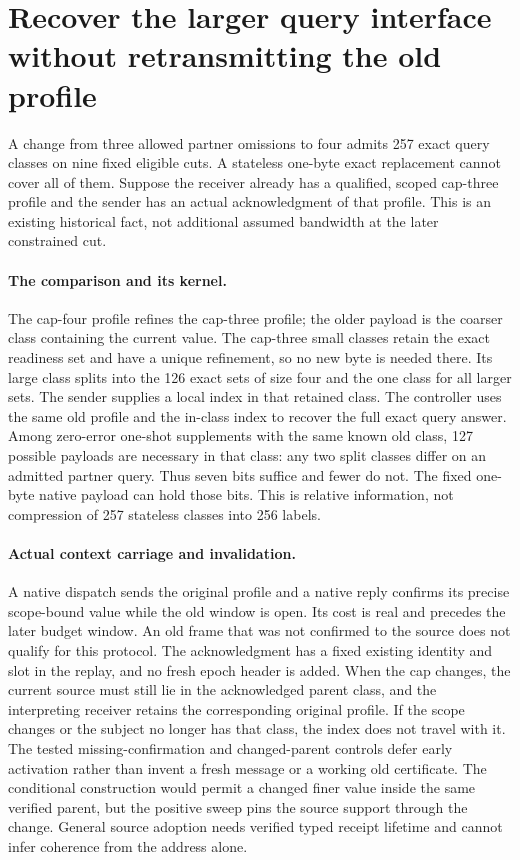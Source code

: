 \documentclass{article}
\begin{document}
\section*{Recover the larger query interface without retransmitting the old profile}
A change from three allowed partner omissions to four admits
257 exact query classes on nine fixed eligible cuts. A stateless
one-byte exact replacement cannot cover all of them. Suppose
the receiver already has a qualified, scoped cap-three profile
and the sender has an actual acknowledgment of that profile.
This is an existing historical fact, not additional assumed
bandwidth at the later constrained cut.

\paragraph{The comparison and its kernel.}
The cap-four profile refines the cap-three profile; the older
payload is the coarser class containing the current value.
The cap-three small classes retain the exact readiness set and
have a unique refinement, so no new byte is needed there.
Its large class splits into the 126 exact sets of size four and
the one class for all larger sets. The sender supplies a local
index in that retained class. The controller uses the same old
profile and the in-class index to recover the full exact query
answer. Among zero-error one-shot supplements with the same
known old class, 127 possible payloads are necessary in that
class: any two split classes differ on an admitted partner
query. Thus seven bits suffice and fewer do not. The fixed
one-byte native payload can hold those bits. This is relative
information, not compression of 257 stateless classes into 256
labels.

\paragraph{Actual context carriage and invalidation.}
A native dispatch sends the original profile and a native
reply confirms its precise scope-bound value while the old
window is open. Its cost is real and precedes the later budget
window. An old frame that was not confirmed to the source
does not qualify for this protocol. The acknowledgment has a
fixed existing identity and slot in the replay, and no fresh
epoch header is added. When the cap changes, the current
source must still lie in the acknowledged parent class, and
the interpreting receiver retains the corresponding original
profile. If the scope changes or the subject no longer has
that class, the index does not travel with it. The tested
missing-confirmation and changed-parent controls defer early
activation rather than invent a fresh message or a working
old certificate. The conditional construction would permit
a changed finer value inside the same verified parent, but
the positive sweep pins the source support through the change.
General source adoption needs verified typed receipt lifetime
and cannot infer coherence from the address alone.
\end{document}
